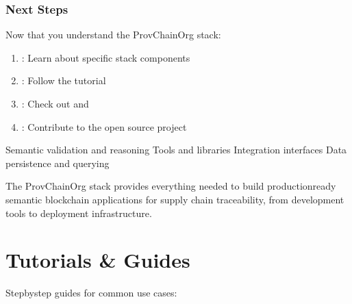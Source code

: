 \documentclass[letterpaper,10pt,english]{sphinxmanual}
\begin{document}
\subsubsection{Next Steps}
\label{\detokenize{stack/intro-to-stack:next-steps}}
\sphinxAtStartPar
Now that you understand the ProvChainOrg stack:
\begin{enumerate}
%
\item {} 
\sphinxAtStartPar
{}: Learn about specific stack components

\item {} 
\sphinxAtStartPar
{}: Follow the {\hyperref[\detokenize{tutorials/first-supply-chain::doc}]{}} tutorial

\item {} 
\sphinxAtStartPar
{}: Check out {\hyperref[\detokenize{api/rest-api::doc}]{}} and 

\item {} 
\sphinxAtStartPar
{}: Contribute to the open source project

\end{enumerate}

\sphinxAtStartPar
{}
\sphinxhyphen{}  \sphinxhyphen{} Semantic validation and reasoning
\sphinxhyphen{}  \sphinxhyphen{} Tools and libraries
\sphinxhyphen{}  \sphinxhyphen{} Integration interfaces
\sphinxhyphen{}  \sphinxhyphen{} Data persistence and querying

\sphinxAtStartPar
The ProvChainOrg stack provides everything needed to build production\sphinxhyphen{}ready semantic blockchain applications for supply chain traceability, from development tools to deployment infrastructure.


\section{Tutorials \& Guides}
\label{\detokenize{index:tutorials-guides}}
\sphinxAtStartPar
Step\sphinxhyphen{}by\sphinxhyphen{}step guides for common use cases:
\end{document}
